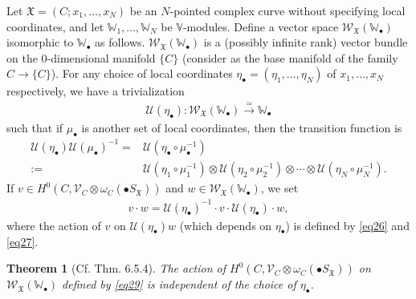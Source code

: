 \documentclass[11pt,b5paper,notitlepage]{article}
\theoremstyle{definition}
\theoremstyle{plain}
\newtheorem{thm}[df]{Theorem}
\newcommand{\fk}{\mathfrak}
\newcommand{\mc}{\mathcal}
\newcommand{\scr}{\mathscr}
\newcommand{\blt}{\bullet}
\newcommand{\Vbb}{\mathbb V}
\newcommand{\Wbb}{\mathbb W}
\numberwithin{equation}{section}
\begin{document}
Let $\fk X=(C;x_1,\dots,x_N)$ be an $N$-pointed complex curve without specifying local coordinates, and let $\Wbb_1,\dots,\Wbb_N$ be $\Vbb$-modules. Define a vector space $\scr W_{\fk X}(\Wbb_\blt)$ isomorphic to $\Wbb_\blt$ as follows. $\scr W_{\fk X}(\Wbb_\blt)$ is a (possibly infinite rank) vector bundle on the $0$-dimensional manifold $\{C\}$ (consider as the base manifold of the family $C\rightarrow \{C\}$). \index{WX@$\scr W_{\fk X}(\Wbb_\blt)$} For any choice of local coordinates $\eta_\blt=(\eta_1,\dots,\eta_N)$ of $x_1,\dots,x_N$ respectively, we have a trivialization \index{U@$\mc U(\eta_\blt)$}
\begin{align}
\mc U(\eta_\blt):\scr W_{\fk X}(\Wbb_\blt)\xrightarrow{\simeq} \Wbb_\blt  \label{eq34}
\end{align}
such that if $\mu_\blt$ is another set of local coordinates, then the transition function is
\begin{align}
\mc U(\eta_\blt)\mc U(\mu_\blt)^{-1}=&\mc U(\eta_\blt\circ\mu_\blt^{-1})\nonumber\\
:=&\mc U(\eta_1\circ\mu_1^{-1})\otimes \mc U(\eta_2\circ\mu_2^{-1})\otimes\cdots\otimes \mc U(\eta_N\circ\mu_N^{-1}).\label{eq32}
\end{align}
If $v\in H^0(C,\scr V_C\otimes\omega_C(\blt S_{\fk X}))$ and $w\in\scr W_{\fk X}(\Wbb_\blt)$, we set
\begin{align}
v\cdot w=\mc U(\eta_\blt)^{-1}\cdot v\cdot\mc U(\eta_\blt)\cdot w,\label{eq29}
\end{align}
where the action of $v$ on $\mc U(\eta_\blt)w$ (which depends on $\eta_\blt$) is defined by \eqref{eq26} and \eqref{eq27}.

\begin{thm}[Cf. \cite{FB04} Thm. 6.5.4]\label{lb13}
The action of $H^0(C,\scr V_C\otimes\omega_C(\blt S_{\fk X}))$ on $\scr W_{\fk X}(\Wbb_\blt)$  defined by \eqref{eq29} is independent of the choice of $\eta_\blt$.
\end{thm}
\end{document}
